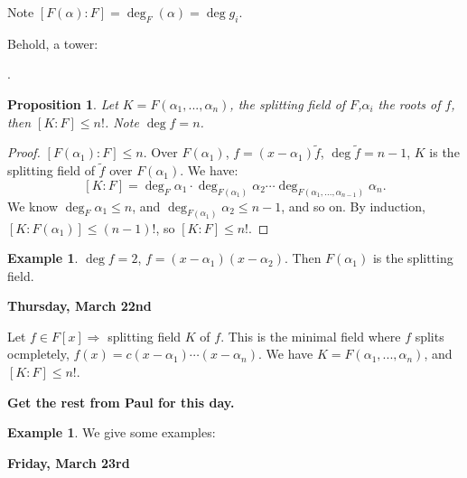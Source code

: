 \documentclass[9pt,reqno,twoside]{amsbook}
\theoremstyle{plain}
\numberwithin{section}{chapter}
\numberwithin{equation}{chapter}
\newtheorem{Prop}[theorem]{Proposition}
\theoremstyle{definition}
\newtheorem{Ex}[theorem]{Example}
\theoremstyle{remark}
\theoremstyle{plain}
\newcommand{\bb}{\vspace{3mm}}
\renewcommand{\leq}{\leqslant}
\begin{document}
Note $[F(\alpha):F] = \deg_F(\alpha) = \deg g_i$. 


Behold, a tower:
\begin{center}
.
\end{center}

\begin{Prop}
Let $K = F(\alpha_1,...,\alpha_n)$, the splitting field of $F$,$\alpha_i$ the roots of $f$, then $[K:F] \leq n!$. Note $\deg f = n$. 
\end{Prop}
\begin{proof}
$[F(\alpha_1):F] \leq n$. Over $F(\alpha_1)$, $f = (x - \alpha_1)\tilde{f}$, $\deg \tilde{f} = n  -1$, $K$ is the splitting field of $\tilde{f}$ over $F(\alpha_1)$. We have:
$$
[K:F] = \deg_F\alpha_1 \cdot \deg_{F(\alpha_1)} \alpha_2 \cdots \deg_{F(\alpha_1,...,\alpha_{n - 1})}\alpha_n.
$$
We know $\deg_F\alpha_1 \leq n$, and $\deg_{F(\alpha_1)} \alpha_2 \leq n - 1$, and so on.
By induction, $[K:F(\alpha_1)] \leq (n - 1)!$, so $[K:F] \leq n!$. 
\end{proof}

\begin{Ex}
$\deg f = 2$, $f = (x - \alpha_1)(x - \alpha_2)$. Then $F(\alpha_1)$ is the splitting field. 
\end{Ex}



\textbf{Thursday, March 22nd}

\bb
Let $f \in F[x] \Rightarrow$ splitting field $K$ of $f$. This is the minimal field where $f$ splits ocmpletely, $f(x) = c(x - \alpha_1)\cdots(x - \alpha_n)$. We have $K = F(\alpha_1,...,\alpha_n)$, and $[K:F] \leq n!$. 

\textbf{Get the rest from Paul for this day. }

\begin{Ex}
We give some examples: 
\end{Ex}







\bb

\textbf{Friday, March 23rd}
\end{document}
